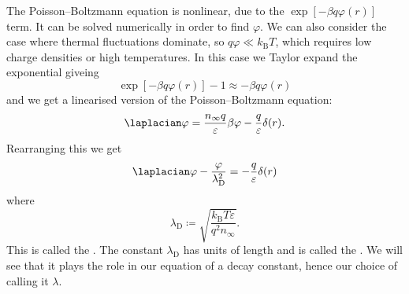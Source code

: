 \documentclass[fleqn]{NotesClass}
\newcommand*{\boltzmann}{k_{\mathrm{B}}}
\begin{document}
    The Poisson--Boltzmann equation is nonlinear, due to the \(\exp[-\beta q\varphi(r)]\) term.
    It can be solved numerically in order to find \(\varphi\).
    We can also consider the case where thermal fluctuations dominate, so \(q\varphi \ll \boltzmann T\), which requires low charge densities or high temperatures.
    In this case we Taylor expand the exponential giveing
    \begin{equation}
        \exp[-\beta q \varphi(r)] - 1 \approx -\beta q \varphi(r)
    \end{equation}
    and we get a linearised version of the Poisson--Boltzmann equation:
    \begin{equation}
        \laplacian \varphi = \frac{n_{\infty}q}{\varepsilon} \beta\varphi - \frac{q}{\varepsilon}\delta(r).
    \end{equation}
    Rearranging this we get
    \begin{equation}
        \laplacian\varphi - \frac{\varphi}{\lambda_{\mathrm{D}}^2} = -\frac{q}{\varepsilon}\delta(r)
    \end{equation}
    where
    \begin{equation}
        \lambda_{\mathrm{D}} \coloneqq \sqrt{\frac{\boltzmann T\varepsilon}{q^2n_{\infty}}}.
    \end{equation}
    This is called the .
    The constant \(\lambda_{\mathrm{D}}\) has units of length and is called the .
    We will see that it plays the role in our equation of a decay constant, hence our choice of calling it \(\lambda\).
    
\end{document}
